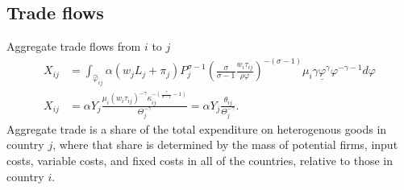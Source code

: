 \documentclass[11pt, pdftex]{article}
\begin{document}
\subsection*{Trade flows}
Aggregate trade flows from $i$ to $j$
\begin{align}
  X_{ij}& = \int_{\hat{\varphi}_{ij}}\alpha\left(w_jL_j+\pi_j \right)P_j^{\sigma-1}\left(\frac{\sigma}{\sigma-1}\frac{w_i\tau_{ij}}{\rho \varphi} \right)^{-(\sigma-1)} \mu_i \gamma \underline{\varphi}^{\gamma} \varphi^{-\gamma-1} d\varphi\\
    X_{ij}& = \alpha Y_j  \frac{\mu_i\left(w_i\tau_{ij}\right) ^{-\gamma} \kappa_{ij}^{-(\frac{\gamma}{\sigma-1}-1)}}{\Theta_j^{-\gamma}}=\alpha Y_j\frac{\theta_{ij}}{\Theta_j^{-\gamma}}.
\end{align}
Aggregate trade is a share of the total expenditure on heterogenous goods in country $j$, where that share is determined by the mass of potential firms, input costs, variable costs, and fixed costs in all of the countries, relative to those in country $i$.
\end{document}
